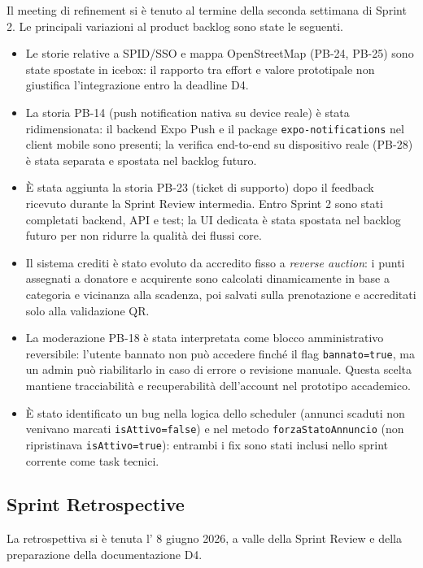 \documentclass[11pt,a4paper]{article}
\newcommand{\code}[1]{\texttt{#1}}
\begin{document}
Il meeting di refinement si è tenuto al termine della seconda settimana di Sprint 2. Le principali variazioni al product backlog sono state le seguenti.

\begin{itemize}[noitemsep]
  \item Le storie relative a SPID/SSO e mappa OpenStreetMap (PB-24, PB-25) sono state spostate in icebox: il rapporto tra effort e valore prototipale non giustifica l'integrazione entro la deadline D4.
  \item La storia PB-14 (push notification nativa su device reale) è stata ridimensionata: il backend Expo Push e il package \code{expo-notifications} nel client mobile sono presenti; la verifica end-to-end su dispositivo reale (PB-28) è stata separata e spostata nel backlog futuro.
  \item È stata aggiunta la storia PB-23 (ticket di supporto) dopo il feedback ricevuto durante la Sprint Review intermedia. Entro Sprint 2 sono stati completati backend, API e test; la UI dedicata è stata spostata nel backlog futuro per non ridurre la qualità dei flussi core.
  \item Il sistema crediti è stato evoluto da accredito fisso a \textit{reverse auction}: i punti assegnati a donatore e acquirente sono calcolati dinamicamente in base a categoria e vicinanza alla scadenza, poi salvati sulla prenotazione e accreditati solo alla validazione QR.
  \item La moderazione PB-18 è stata interpretata come blocco amministrativo reversibile: l'utente bannato non può accedere finché il flag \code{bannato=true}, ma un admin può riabilitarlo in caso di errore o revisione manuale. Questa scelta mantiene tracciabilità e recuperabilità dell'account nel prototipo accademico.
  \item È stato identificato un bug nella logica dello scheduler (annunci scaduti non venivano marcati \code{isAttivo=false}) e nel metodo \code{forzaStatoAnnuncio} (non ripristinava \code{isAttivo=true}): entrambi i fix sono stati inclusi nello sprint corrente come task tecnici.
\end{itemize}

\subsection{Sprint Retrospective}

La retrospettiva si è tenuta l' 8 giugno 2026, a valle della Sprint Review e della preparazione della documentazione D4.
\end{document}
